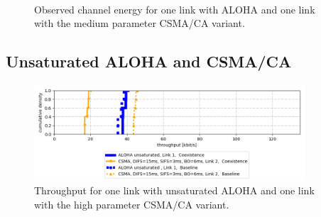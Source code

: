 \begin{figure}[bt]
	\label{fig:results-aloha-csma-channel-meta}
	\begin{center}
		\\
	\end{center}
	\caption{Observed channel energy for one link with ALOHA and one link with the medium parameter CSMA/CA variant.}
\end{figure}

\clearpage

\subsection{Unsaturated ALOHA and CSMA/CA}
\label{sec:unsat-aloha-csma}

\begin{figure}[tb]
	\label{fig:results-unsat-aloha-csma-throughput}
	\begin{center}
		\includegraphics[width=0.9\textwidth]{pictures/results/different_combinations/aloha_unsat_csma/throughput_cdf}
	\end{center}
	\caption{Throughput for one link with unsaturated ALOHA and one link with the high parameter CSMA/CA variant.}
\end{figure}


